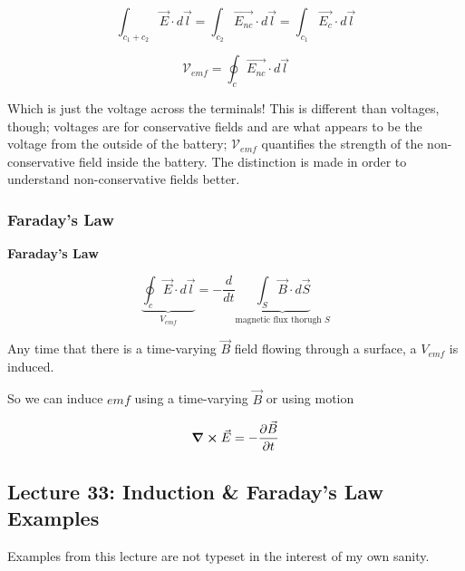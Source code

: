 \documentclass[10pt]{article}
\begin{document}
\begin{equation}
	\int_{c_1 + c_2} \vec{E} \cdot  d \vec{l}= \int_{c_2} \vec{E_{nc}} \cdot  d \vec{l} = \int_{c_1} \vec{E_c} \cdot  d \vec{l}
\end{equation}

\begin{equation}
	\mathcal{V}_{emf} = \oint_c \vec{E_{nc}} \cdot  d \vec{l}
\end{equation}

Which is just the voltage across the terminals!
This is different than voltages, though; voltages are for conservative fields and are what appears to be the voltage from the outside of the battery; $ \mathcal{V}_{emf} $ quantifies the strength of the non-conservative field inside the battery.
The distinction is made in order to understand non-conservative fields better.

\subsubsection{Faraday's Law}

\begin{definition}
	\textbf{Faraday's Law} 

	\begin{equation}
	\underbrace{\oint_c \vec{E} \cdot  d \vec{l}}_{V_{emf}} = - \frac{d}{dt} \underbrace{\int_S \vec{B} \cdot d \vec{S}}_{\text{magnetic flux thorugh }S}
		\label{eq:259:faraday_integral}
	\end{equation}

	Any time that there is a time-varying $ \vec{B} $  field flowing through a surface, a $ V_{emf} $ is induced.

	So we can induce $ emf $ using a time-varying $ \vec{B} $ or using motion

	\begin{equation}
		\curl \vec{E} = -\frac{\partial \vec{B}}{\partial t} 
		\label{eq:259:faraday_diff}
	\end{equation}
	




\end{definition}

\subsection{Lecture 33: Induction \& Faraday's Law Examples}
\begin{blockquote}
	Examples from this lecture are not typeset in the interest of my own sanity.
\end{blockquote}
\end{document}
